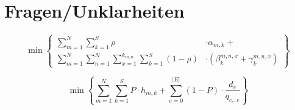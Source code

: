 \documentclass[conference]{IEEEtran}
\begin{document}
\section{Fragen/Unklarheiten}



  
\begin{equation}
     \min\left\{\begin{split} \sum\limits_{m=1}^N \sum\limits_{k=1}^S \rho &\cdot\alpha_{m,k} + \\
         \sum\limits_{m=1}^N \sum\limits_{n=1}^N \sum\limits_{x=1}^{k_{m,n}}
\sum\limits_{k=1}^S (1-\rho)&\cdot(\beta_{k}^{m,n,x}+ \gamma_{k}^{m,n,x})\end{split}\right\}
\end{equation}

 \begin{equation}
\min \left\{ \sum_{m=1}^N \sum_{k=1}^S P \cdot h_{m,k} + \sum_{e=0}^{|E|} (1-P) \cdot \frac{d_e}{q_{c_{e},e}} \right\}
 \end{equation}
\end{document}
